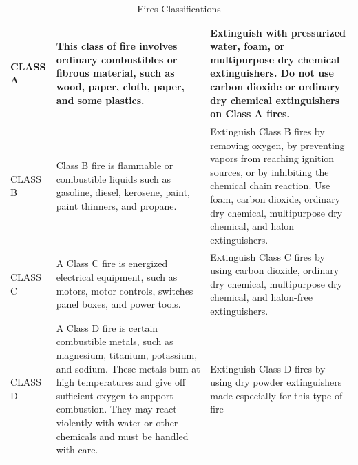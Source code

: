 \documentclass{article}
\begin{document}
\begin{table}[h!]
\begin{tabular}{|p{2cm}|p{5.5cm}|p{5.5cm}|}
CLASS A                                       & This class of fire involves ordinary combustibles  or fibrous material, such as wood, paper, cloth, paper, and some plastics.                                                                                                                                                               & Extinguish with pressurized   water, foam, or multipurpose dry chemical extinguishers. Do not use carbon   dioxide or ordinary dry chemical extinguishers on Class A fires.                                                                                \\ \hline
CLASS B                                       & Class B fire is flammable or   combustible liquids such as gasoline, diesel, kerosene, paint, paint   thinners, and propane.                                                                                                                                                                & Extinguish Class B fires by   removing oxygen, by preventing vapors from reaching ignition sources, or by   inhibiting the chemical chain reaction. Use foam, carbon dioxide, ordinary   dry chemical, multipurpose dry chemical, and halon extinguishers. \\ \hline
CLASS C                                       & A Class C fire is energized   electrical equipment, such as motors, motor controls, switches panel boxes,   and power tools.                                                                                                                                                                & Extinguish Class C fires by   using carbon dioxide, ordinary dry chemical, multipurpose dry chemical, and   halon-free extinguishers.                                                                                                                      \\ \hline
CLASS D                                       & A Class D fire is certain   combustible metals, such as magnesium, titanium, potassium, and sodium. These   metals bum at high temperatures and give off sufficient oxygen to support   combustion. They may react violently with water or other chemicals and must be   handled with care. & Extinguish Class D fires by   using dry powder extinguishers made especially for this type of fire                                                                                                                                                         \\ \hline
\end{tabular}
\caption{Fires Classifications}
\end{table}
\end{document}
